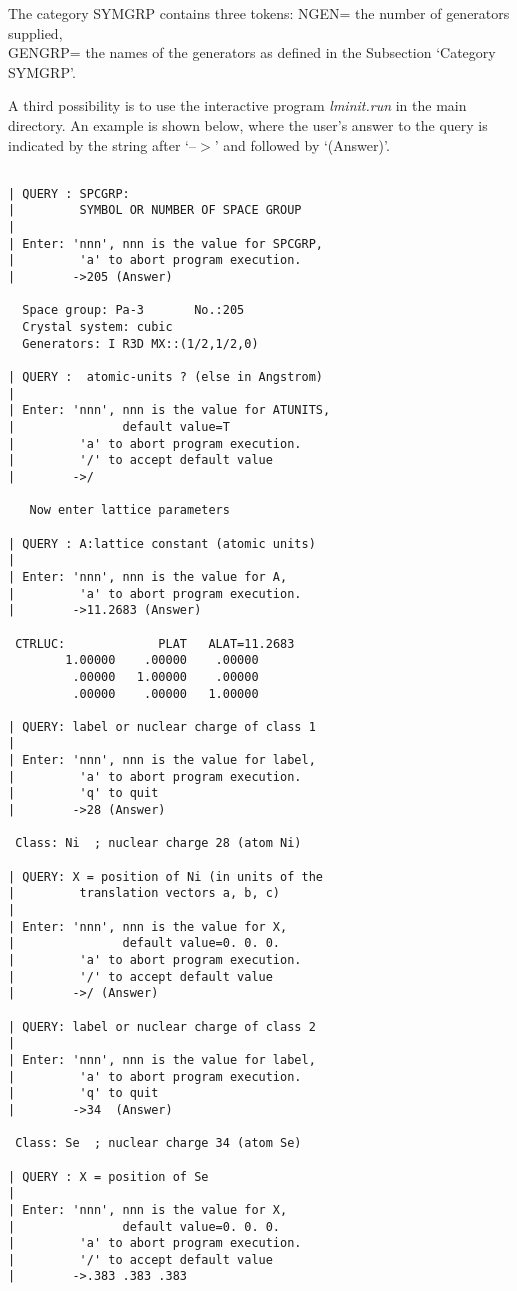 \documentclass[aps,twocolumn,a4]{revtex4}
\begin{document}
\begin{enumerate}
The category SYMGRP contains three tokens: NGEN= the number of
generators supplied,\\
GENGRP= the names of the generators as defined in
the Subsection `Category SYMGRP'.

A third possibility is to use the interactive program
{\em lminit.run} in the main directory. An example
is shown below, where the user's answer
to the query is indicated by the string after `--$>$' and followed
by `(Answer)'.
\begin{verbatim}

| QUERY : SPCGRP:
|         SYMBOL OR NUMBER OF SPACE GROUP
|
| Enter: 'nnn', nnn is the value for SPCGRP,
|         'a' to abort program execution.
|        ->205 (Answer)

  Space group: Pa-3       No.:205
  Crystal system: cubic
  Generators: I R3D MX::(1/2,1/2,0)

| QUERY :  atomic-units ? (else in Angstrom)
|
| Enter: 'nnn', nnn is the value for ATUNITS,
|               default value=T
|         'a' to abort program execution.
|         '/' to accept default value
|        ->/

   Now enter lattice parameters

| QUERY : A:lattice constant (atomic units)
|
| Enter: 'nnn', nnn is the value for A,
|         'a' to abort program execution.
|        ->11.2683 (Answer)

 CTRLUC:             PLAT   ALAT=11.2683
        1.00000    .00000    .00000
         .00000   1.00000    .00000
         .00000    .00000   1.00000

| QUERY: label or nuclear charge of class 1
|
| Enter: 'nnn', nnn is the value for label,
|         'a' to abort program execution.
|         'q' to quit
|        ->28 (Answer)

 Class: Ni  ; nuclear charge 28 (atom Ni)

| QUERY: X = position of Ni (in units of the
|         translation vectors a, b, c)
|
| Enter: 'nnn', nnn is the value for X,
|               default value=0. 0. 0.
|         'a' to abort program execution.
|         '/' to accept default value
|        ->/ (Answer)

| QUERY: label or nuclear charge of class 2
|
| Enter: 'nnn', nnn is the value for label,
|         'a' to abort program execution.
|         'q' to quit
|        ->34  (Answer)

 Class: Se  ; nuclear charge 34 (atom Se)

| QUERY : X = position of Se
|
| Enter: 'nnn', nnn is the value for X,
|               default value=0. 0. 0.
|         'a' to abort program execution.
|         '/' to accept default value
|        ->.383 .383 .383


\end{verbatim}
\end{enumerate}
\end{document}
